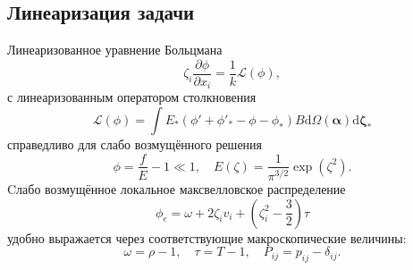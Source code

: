 \documentclass[a4paper,12pt]{article}
\newcommand{\dd}{\mathrm{d}}
\newcommand{\pder}[2][]{\frac{\partial#1}{\partial#2}}
\begin{document}
\subsection{Линеаризация задачи}
\newcommand{\edzeta}{E\boldsymbol{\dd\zeta}}

Линеаризованное уравнение Больцмана
\begin{equation}\label{eq:linear_Boltzmann}
    \zeta_i \pder[\phi]{x_i} = \frac1k \mathcal{L}(\phi),
\end{equation}
с линеаризованным оператором столкновения
\begin{equation}\label{eq:linear_ci}
    \mathcal{L}(\phi) = \int E_*(\phi'+\phi'_*-\phi-\phi_*) B
    \dd \Omega(\boldsymbol{\alpha}) \boldsymbol{\dd \zeta_*}
\end{equation}
справедливо для слабо возмущённого решения
\begin{equation}\label{eq:linear_condition}
    \phi = \frac{f}{E} - 1 \ll 1, \quad E(\zeta) = \frac1{\pi^{3/2}}\exp\left(\zeta^2\right).
\end{equation}
Cлабо возмущённое локальное максвелловское распределение
\begin{equation}\label{eq:linear_maxwellian}
    \phi_e = \omega + 2\zeta_i v_i + \left(\zeta_i^2-\frac32\right)\tau
\end{equation}
удобно выражается через соответствующие макроскопические величины:
\begin{equation}
    \omega = \rho-1, \quad \tau = T-1, \quad P_{ij} = p_{ij} - \delta_{ij}.
\end{equation}
\end{document}
